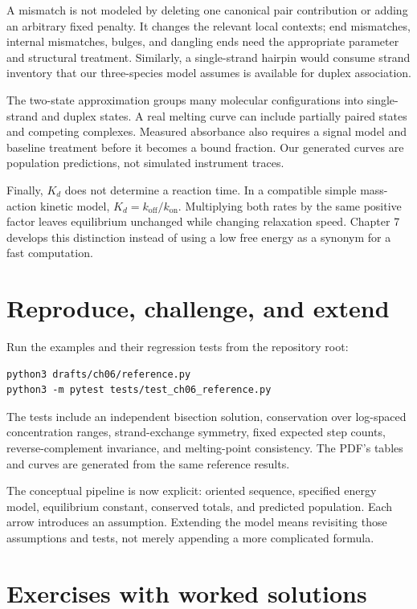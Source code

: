 A mismatch is not modeled by deleting one canonical pair contribution or
adding an arbitrary fixed penalty. It changes the relevant local contexts;
end mismatches, internal mismatches, bulges, and dangling ends need the
appropriate parameter and structural treatment. Similarly, a single-strand
hairpin would consume strand inventory that our three-species model assumes
is available for duplex association.

The two-state approximation groups many molecular configurations into
single-strand and duplex states. A real melting curve can include partially
paired states and competing complexes. Measured absorbance also requires
a signal model and baseline treatment before it becomes a bound fraction.
Our generated curves are population predictions, not simulated instrument traces.

Finally, $K_d$ does not determine a reaction time. In a compatible simple
mass-action kinetic model, $K_d=k_{\mathrm{off}}/k_{\mathrm{on}}$.
Multiplying both rates by the same positive factor leaves equilibrium
unchanged while changing relaxation speed. Chapter 7 develops this distinction
instead of using a low free energy as a synonym for a fast computation.

\section{Reproduce, challenge, and extend}

Run the examples and their regression tests from the repository root:
\begin{Verbatim}[fontsize=\small]
python3 drafts/ch06/reference.py
python3 -m pytest tests/test_ch06_reference.py
\end{Verbatim}
The tests include an independent bisection solution, conservation over
log-spaced concentration ranges, strand-exchange symmetry, fixed expected
step counts, reverse-complement invariance, and melting-point consistency.
The PDF's tables and curves are generated from the same reference results.

The conceptual pipeline is now explicit: oriented sequence, specified
energy model, equilibrium constant, conserved totals, and predicted population.
Each arrow introduces an assumption. Extending the model means revisiting
those assumptions and tests, not merely appending a more complicated formula.

\section{Exercises with worked solutions}


